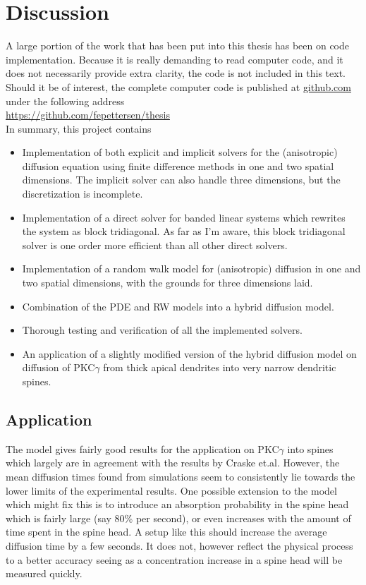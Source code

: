 \section{Discussion}

A large portion of the work that has been put into this thesis has been on code implementation. 
Because it is really demanding to read computer code, and it does not necessarily provide extra clarity, the code is not included in this text. 
Should it be of interest, the complete computer code is published at \url{github.com} under the following address \\

\noindent\url{https://github.com/fepettersen/thesis} \\

In summary, this project contains
\begin{itemize}
 \item Implementation of both explicit and implicit solvers for the (anisotropic) diffusion equation using finite difference methods in one and two spatial dimensions. The implicit solver can also handle three dimensions, but the discretization is incomplete.
 \item Implementation of a direct solver for banded linear systems which rewrites the system as block tridiagonal. As far as I'm aware, this block tridiagonal solver is one order more efficient than all other direct solvers.
 \item Implementation of a random walk model for (anisotropic) diffusion in one and two spatial dimensions, with the grounds for three dimensions laid.
 \item Combination of the PDE and RW models into a hybrid diffusion model. 
 \item Thorough testing and verification of all the implemented solvers.
 \item An application of a slightly modified version of the hybrid diffusion model on diffusion of PKC$\gamma$ from thick apical dendrites into very narrow dendritic spines.
\end{itemize}


\subsection{Application}

The model gives fairly good results for the application on PKC$\gamma$ into spines which largely are in agreement with the results by Craske et.al. 
However, the mean diffusion times found from simulations seem to consistently lie towards the lower limits of the experimental results. 
One possible extension to the model which might fix this is to introduce an absorption probability in the spine head which is fairly large (say 80\% per second), or even increases with the amount of time spent in the spine head. 
A setup like this should increase the average diffusion time by a few seconds. 
It does not, however reflect the physical process to a better accuracy seeing as a concentration increase in a spine head will be measured quickly.

